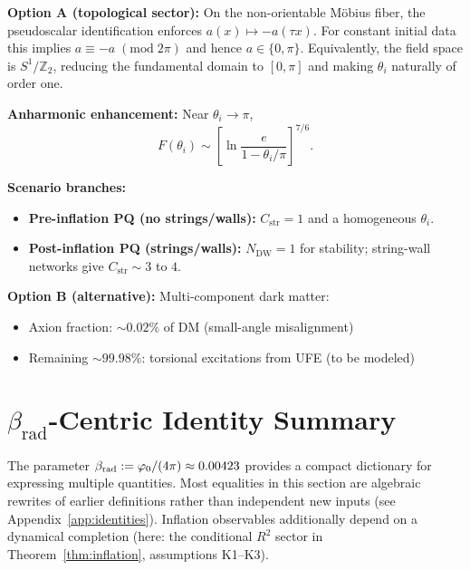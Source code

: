\begin{tcolorbox}[colback=yellow!5, colframe=yellow!60!black, 
    title={\textbf{Resolution: Topologically Preferred $\theta_i$}}, fonttitle=\bfseries\small]
\textbf{Option A (topological sector):} On the non-orientable M\"obius fiber, the pseudoscalar
identification enforces $a(x)\mapsto -a(\tau x)$. For constant initial data this implies
$a \equiv -a \;(\mathrm{mod}\;2\pi)$ and hence $a \in \{0,\pi\}$. Equivalently, the field space
is $S^1/\mathbb{Z}_2$, reducing the fundamental domain to $[0,\pi]$ and making $\theta_i$
naturally of order one.

\textbf{Anharmonic enhancement:} Near $\theta_i \to \pi$,
\begin{equation}
    F(\theta_i) \sim \left[\ln\frac{e}{1 - \theta_i/\pi}\right]^{7/6}.
\end{equation}

\textbf{Scenario branches:}
\begin{itemize}[leftmargin=1.5em, topsep=2pt, itemsep=1pt]
    \item \textbf{Pre-inflation PQ (no strings/walls):} $C_{\mathrm{str}}=1$ and a homogeneous $\theta_i$.
    \item \textbf{Post-inflation PQ (strings/walls):} $N_{\mathrm{DW}}=1$ for stability; string-wall networks give $C_{\mathrm{str}}\sim 3$ to $4$.
\end{itemize}

\textbf{Option B (alternative):} Multi-component dark matter:
\begin{itemize}[leftmargin=1.5em, topsep=2pt, itemsep=1pt]
    \item Axion fraction: $\sim 0.02\%$ of DM (small-angle misalignment)
    \item Remaining $\sim 99.98\%$: torsional excitations from UFE (to be modeled)
\end{itemize}
\end{tcolorbox}

\section{$\beta_{\text{rad}}$-Centric Identity Summary}

The parameter $\beta_{\text{rad}} := \varphi_0/(4\pi) \approx 0.00423$ provides a compact dictionary for expressing multiple quantities. 
Most equalities in this section are algebraic rewrites of earlier definitions rather than independent new inputs (see Appendix~\ref{app:identities}). 
Inflation observables additionally depend on a dynamical completion (here: the conditional $R^2$ sector in Theorem~\ref{thm:inflation}, assumptions K1--K3).

